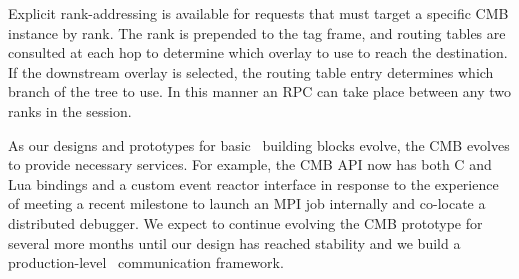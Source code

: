 Explicit rank-addressing is available for requests that must target a
specific CMB instance by rank.  The rank is prepended to the tag frame,
and routing tables are consulted at each hop to determine which overlay
to use to reach the destination.  If the downstream overlay is selected,
the routing table entry determines which branch of the tree to use.
In this manner an RPC can take place between any two ranks in the session.

As our designs and prototypes for basic \flux\ building blocks evolve,
the CMB evolves to provide necessary services.  For example, the CMB API
now has both C and Lua bindings and a custom event reactor interface in
response to the experience of meeting a recent milestone to launch an
MPI job internally and co-locate a distributed debugger.  We expect
to continue evolving the CMB prototype for several more months until
our design has reached stability and we build a production-level \flux\ 
communication framework.
